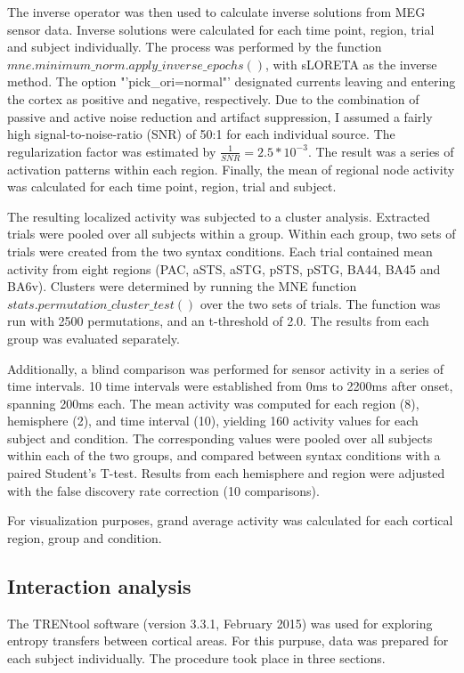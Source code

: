 The inverse operator was then used to calculate inverse solutions from MEG sensor data.
Inverse solutions were calculated for each time point, region, trial and subject individually.
The process was performed by the function $mne.minimum\_norm.apply\_inverse\_epochs()$, with sLORETA as the inverse method.
The option "'pick\_ori=normal"' designated currents leaving and entering the cortex as positive and negative, respectively.
Due to the combination of passive and active noise reduction and artifact suppression, I assumed a fairly high signal-to-noise-ratio (SNR) of 50:1 for each individual source.
The regularization factor was estimated by $\frac{1}{SNR} = 2.5*10^{-3}$.
The result was a series of activation patterns within each region.
Finally, the mean of regional node activity was calculated for each time point, region, trial and subject.


The resulting localized activity was subjected to a cluster analysis.
Extracted trials were pooled over all subjects within a group.
Within each group, two sets of trials were created from the two syntax conditions.
Each trial contained mean activity from eight regions (PAC, aSTS, aSTG, pSTS, pSTG, BA44, BA45 and BA6v).
Clusters were determined by running the MNE function $stats.permutation\_cluster\_test()$ \cite{3.3.clustertest} over the two sets of trials.
The function was run with 2500 permutations, and an t-threshold of 2.0.
The results from each group was evaluated separately.

Additionally, a blind comparison was performed for sensor activity in a series of time intervals.
10 time intervals were established from 0ms to 2200ms after onset, spanning 200ms each.
The mean activity was computed for each region (8), hemisphere (2), and time interval (10), yielding 160 activity values for each subject and condition.
The corresponding values were pooled over all subjects within each of the two groups, and compared between syntax conditions with a paired Student's T-test.
Results from each hemisphere and region were adjusted with the false discovery rate correction (10 comparisons).

For visualization purposes, grand average activity was calculated for each cortical region, group and condition.


\subsection{Interaction analysis}

The TRENtool software (version 3.3.1, February 2015) was used for exploring entropy transfers between cortical areas.
For this purpuse, data was prepared for each subject individually.
The procedure took place in three sections.


